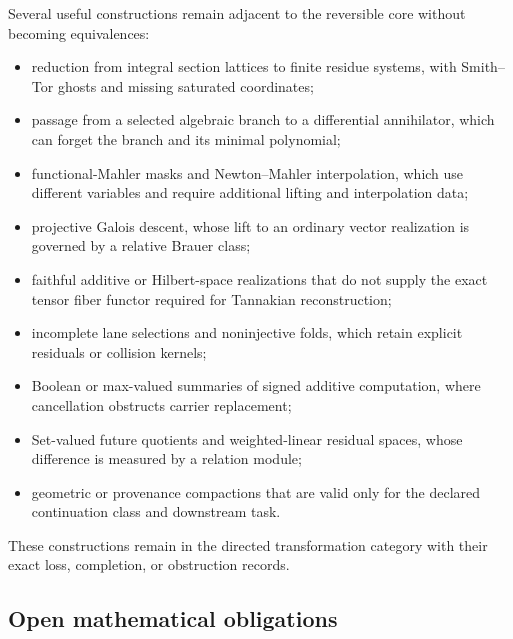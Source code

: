 Several useful constructions remain adjacent to the reversible core without becoming equivalences:
\begin{itemize}
\item reduction from integral section lattices to finite residue systems, with Smith--Tor ghosts and missing saturated coordinates;
\item passage from a selected algebraic branch to a differential annihilator, which can forget the branch and its minimal polynomial;
\item functional-Mahler masks and Newton--Mahler interpolation, which use different variables and require additional lifting and interpolation data;
\item projective Galois descent, whose lift to an ordinary vector realization is governed by a relative Brauer class;
\item faithful additive or Hilbert-space realizations that do not supply the exact tensor fiber functor required for Tannakian reconstruction;
\item incomplete lane selections and noninjective folds, which retain explicit residuals or collision kernels;
\item Boolean or max-valued summaries of signed additive computation, where cancellation obstructs carrier replacement;
\item Set-valued future quotients and weighted-linear residual spaces, whose difference is measured by a relation module;
\item geometric or provenance compactions that are valid only for the declared continuation class and downstream task.
\end{itemize}
These constructions remain in the directed transformation category with their exact loss, completion, or obstruction records.

\subsection{Open mathematical obligations}

